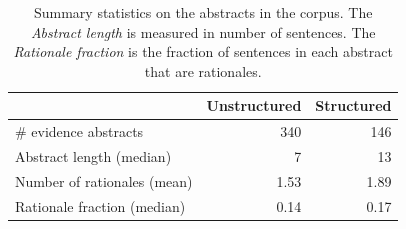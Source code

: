 \begin{table}[H]
  \setlength{\tabcolsep}{.25em}
  \footnotesize
  \centering

  \begin{tabular}{ l  r  r }
    \toprule
                                  & Unstructured & Structured \\
    \midrule
    \# evidence abstracts         & 340          & 146        \\
    Abstract length (median)      & 7            & 13         \\
    Number of rationales (mean) & 1.53            & 1.89          \\
    Rationale fraction (median)   & 0.14         & 0.17       \\
    \bottomrule
  \end{tabular}

  \caption{Summary statistics on the abstracts in the corpus. The \emph{Abstract length} is measured in number of sentences. The \emph{Rationale fraction} is the fraction of sentences in each abstract that are rationales.}
  \label{tbl:dataset_overview}
\end{table}